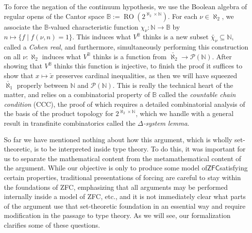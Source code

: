 \documentclass[a4paper,USenglish,cleveref, autoref]{lipics-v2019}
\newcommand{\B}{\mathbb{B}}
\theoremstyle{definition}
\begin{document}
To force the negation of the continuum hypothesis, we use the Boolean algebra of regular opens of the Cantor space $\B := \operatorname{RO}(2^{\aleph_2 \times \mathbb{N}})$. For each $\nu \in \aleph_2$, we associate the $\B$-valued characteristic function $\chi_\nu : \mathbb{N} \to \B$ by $n \mapsto \{f \operatorname{|} f(\nu, n) = 1\}$. This induces what $V^\B$ thinks is a new subset $\widetilde{\chi_{\nu}} \subseteq \mathbb{N}$, called a \emph{Cohen real}, and furthermore, simultaneously performing this construction on all $\nu : \aleph_2$ induces what $V^\B$ thinks is a function from $\check{\aleph_2} \to \mathcal{P}(\mathbb{N})$. After showing that $V^\B$ thinks this function is injective, to finish the proof it suffices to show that $x \mapsto \check{x}$ preserves cardinal inequalities, as then we will have squeezed $\check{\aleph_1}$ properly between $\mathbb{N}$ and $\mathcal{P}(\mathbb{N})$. This is really the technical heart of the matter, and relies on a combinatorial property of $\B$ called the \emph{countable chain condition} (CCC), the proof of which requires a detailed combinatorial analysis of the basis of the product topology for $2^{\aleph_2 \times \mathbb{N}}$, which we handle with a general result in transfinite combinatorics called the \emph{$\Delta$-system lemma}.

So far we have mentioned nothing about how this argument, which is wholly set-theoretic, is to be interpreted inside type theory. To do this, it was important for us to separate the mathematical content from the metamathematical content of the argument. While our objective is only to produce some model of$\mathsf{ZFC}$satisfying certain properties, traditional presentations of forcing are careful to stay within the foundations of ZFC, emphasizing that all arguments may be performed internally inside a model of ZFC, etc., and it is not immediately clear what parts of the argument use that set-theoretic foundation in an essential way %
and require modification in the passage to type theory. As we will see, our formalization clarifies some of these questions.
\end{document}
